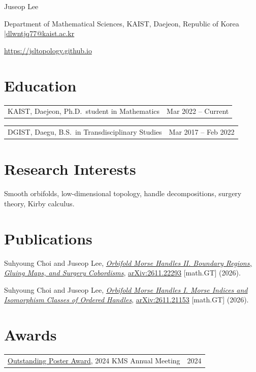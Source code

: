 \documentclass[11pt,a4paper]{article}
\makeatletter
\newcommand{\cvitem}[1]{\par\noindent #1\par\vspace{0.27em}}
\newcommand{\cvdated}[2]{%
  \noindent\begin{tabularx}{\linewidth}{@{}Xr@{}}
    #1 & #2
  \end{tabularx}\par}
\makeatother
\begin{document}
\begin{center}
  {\fontsize{23}{27}\selectfont Juseop Lee}\par
  \vspace{0.32em}
  Department of Mathematical Sciences, KAIST, Daejeon, Republic of Korea
  \quad|\quad \href{mailto:dlwntjq77@kaist.ac.kr}{dlwntjq77@kaist.ac.kr}\par
  \vspace{0.18em}
  \href{https://jsltopology.github.io}{https://jsltopology.github.io}
\end{center}
\vspace{-0.7em}

\section*{Education}
\cvdated{KAIST, Daejeon, Ph.D.\ student in Mathematics}{Mar 2022 -- Current}
\cvdated{DGIST, Daegu, B.S.\ in Transdisciplinary Studies}{Mar 2017 -- Feb 2022}

\section*{Research Interests}
Smooth orbifolds, low-dimensional topology, handle decompositions, surgery theory, Kirby calculus.

\section*{Publications}
\cvitem{Suhyoung Choi and Juseop Lee, \href{https://arxiv.org/abs/2611.22293}{\emph{Orbifold Morse Handles II. Boundary Regions, Gluing Maps, and Surgery Cobordisms}}, \href{https://arxiv.org/abs/2611.22293}{arXiv:2611.22293} [math.GT] (2026).}
\cvitem{Suhyoung Choi and Juseop Lee, \href{https://arxiv.org/abs/2611.21153}{\emph{Orbifold Morse Handles I. Morse Indices and Isomorphism Classes of Ordered Handles}}, \href{https://arxiv.org/abs/2611.21153}{arXiv:2611.21153} [math.GT] (2026).}

\section*{Awards}
\cvdated{\href{https://www.kms.or.kr/board/list.html?code=md_meet\&num=24636\&period=88\&period_url=2024_fall}{Outstanding Poster Award}, 2024 KMS Annual Meeting}{2024}
\end{document}
